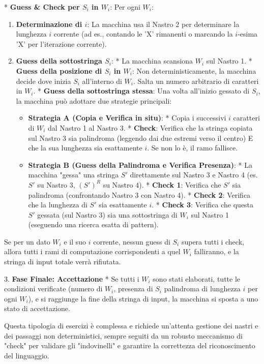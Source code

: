 \documentclass[a4paper]{article}
\begin{document}
    *   \textbf{Guess \& Check per $S_i$ in $W_i$}: Per ogni $W_i$:
        \begin{enumerate}
            \item \textbf{Determinazione di $i$}: La macchina usa il Nastro 2 per determinare la lunghezza $i$ corrente (ad es., contando le 'X' rimanenti o marcando la $i$-esima 'X' per l'iterazione corrente).

            \item \textbf{Guess della sottostringa $S_i$}:
                *   La macchina scansiona $W_i$ sul Nastro 1.
                *   \textbf{Guess della posizione di $S_i$ in $W_i$}: Non deterministicamente, la macchina decide dove inizia $S_i$ all'interno di $W_i$. Salta un numero arbitrario di caratteri in $W_i$.
                *   \textbf{Guess della sottostringa stessa}: Una volta all'inizio gessato di $S_i$, la macchina può adottare due strategie principali:
                    \begin{itemize}
                        \item \textbf{Strategia A (Copia e Verifica in situ)}:
                            *   Copia i successivi $i$ caratteri di $W_i$ dal Nastro 1 al Nastro 3.
                            *   \textbf{Check}: Verifica che la stringa copiata sul Nastro 3 sia palindroma (leggendo dai due estremi verso il centro) E che la sua lunghezza sia esattamente $i$. Se non lo è, il ramo fallisce.
                        \item \textbf{Strategia B (Guess della Palindroma e Verifica Presenza)}:
                            *   La macchina "gessa" una stringa $S'$ direttamente sul Nastro 3 e Nastro 4 (es. $S'$ su Nastro 3, $(S')^R$ su Nastro 4).
                            *   \textbf{Check 1}: Verifica che $S'$ sia palindroma (confrontando Nastro 3 con Nastro 4).
                            *   \textbf{Check 2}: Verifica che la lunghezza di $S'$ sia esattamente $i$.
                            *   \textbf{Check 3}: Verifica che questa $S'$ gessata (sul Nastro 3) sia una sottostringa di $W_i$ sul Nastro 1 (eseguendo una ricerca esatta di pattern).
                    \end{itemize}
        \end{enumerate}
        Se per un dato $W_i$ e il suo $i$ corrente, nessun guess di $S_i$ supera tutti i check, allora tutti i rami di computazione corrispondenti a quel $W_i$ falliranno, e la stringa di input totale verrà rifiutata.

3.  \textbf{Fase Finale: Accettazione}
    *   Se tutti i $W_i$ sono stati elaborati, tutte le condizioni verificate (numero di $W_i$, presenza di $S_i$ palindroma di lunghezza $i$ per ogni $W_i$), e si raggiunge la fine della stringa di input, la macchina si sposta a uno stato di accettazione.

Questa tipologia di esercizi è complessa e richiede un'attenta gestione dei nastri e dei passaggi non deterministici, sempre seguiti da un robusto meccanismo di "check" per validare gli "indovinelli" e garantire la correttezza del riconoscimento del linguaggio.
\end{document}
